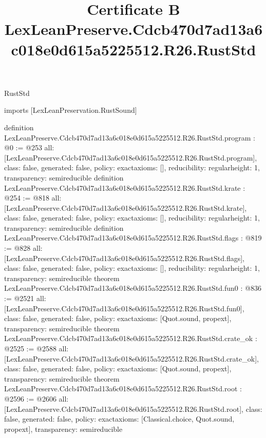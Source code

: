 \begin{lexlean}{RustStd}
\title{Certificate B LexLeanPreserve.Cdcb470d7ad13a6c018e0d615a5225512.R26.RustStd}
\begin{coremodule}
imports [LexLeanPreservation.RustSound]

definition LexLeanPreserve.Cdcb470d7ad13a6c018e0d615a5225512.R26.RustStd.program : @0 := @253 {
  all: [LexLeanPreserve.Cdcb470d7ad13a6c018e0d615a5225512.R26.RustStd.program],
  class: false,
  generated: false,
  policy: exact{axioms: []},
  reducibility: regular{height: 1},
  transparency: semireducible
}
definition LexLeanPreserve.Cdcb470d7ad13a6c018e0d615a5225512.R26.RustStd.krate : @254 := @818 {
  all: [LexLeanPreserve.Cdcb470d7ad13a6c018e0d615a5225512.R26.RustStd.krate],
  class: false,
  generated: false,
  policy: exact{axioms: []},
  reducibility: regular{height: 1},
  transparency: semireducible
}
definition LexLeanPreserve.Cdcb470d7ad13a6c018e0d615a5225512.R26.RustStd.flags : @819 := @828 {
  all: [LexLeanPreserve.Cdcb470d7ad13a6c018e0d615a5225512.R26.RustStd.flags],
  class: false,
  generated: false,
  policy: exact{axioms: []},
  reducibility: regular{height: 1},
  transparency: semireducible
}
theorem LexLeanPreserve.Cdcb470d7ad13a6c018e0d615a5225512.R26.RustStd.fun0 : @836 := @2521 {
  all: [LexLeanPreserve.Cdcb470d7ad13a6c018e0d615a5225512.R26.RustStd.fun0],
  class: false,
  generated: false,
  policy: exact{axioms: [Quot.sound, propext]},
  transparency: semireducible
}
theorem LexLeanPreserve.Cdcb470d7ad13a6c018e0d615a5225512.R26.RustStd.crate_ok : @2525 := @2588 {
  all: [LexLeanPreserve.Cdcb470d7ad13a6c018e0d615a5225512.R26.RustStd.crate_ok],
  class: false,
  generated: false,
  policy: exact{axioms: [Quot.sound, propext]},
  transparency: semireducible
}
theorem LexLeanPreserve.Cdcb470d7ad13a6c018e0d615a5225512.R26.RustStd.root : @2596 := @2606 {
  all: [LexLeanPreserve.Cdcb470d7ad13a6c018e0d615a5225512.R26.RustStd.root],
  class: false,
  generated: false,
  policy: exact{axioms: [Classical.choice, Quot.sound, propext]},
  transparency: semireducible
}


\end{coremodule}
\end{lexlean}
